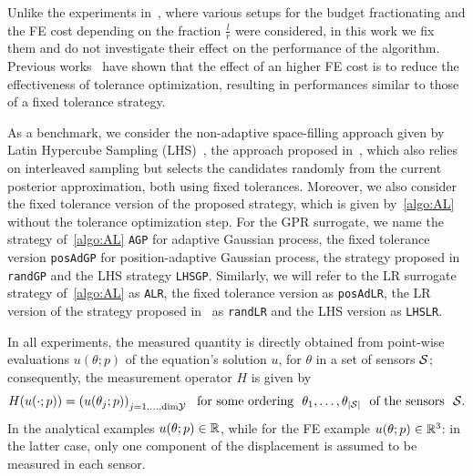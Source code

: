 Unlike the experiments in~\cite{VillaniArconesUngerWeiser2025}, where various setups for the budget fractionating and the FE cost depending on the fraction $\frac{l}{r}$ were considered, in this work we fix them and do not investigate their effect on the performance of the algorithm.
Previous works~\cite{SemlerWeiser2023,VillaniArconesUngerWeiser2025,VillaniUngerWeiser2024} have shown that the effect of an higher FE cost is to reduce the effectiveness of tolerance optimization, resulting in performances similar to those of a fixed tolerance strategy.

As a benchmark, we consider the non-adaptive space-filling approach given by Latin Hypercube Sampling (LHS)~\cite{McKayBeckmanConover1979}, the approach proposed in~\cite{Dinkel2024}, which also relies on interleaved sampling but selects the candidates randomly from the current posterior approximation, both using fixed tolerances.
Moreover, we also consider the fixed tolerance version of the proposed strategy, which is given by~\ref{algo:AL} without the tolerance optimization step. 
For the GPR surrogate, we name the strategy of~\ref{algo:AL} \texttt{AGP} for adaptive Gaussian process, the fixed tolerance version \texttt{posAdGP} for position-adaptive Gaussian process, the strategy proposed in~\cite{Dinkel2024} \texttt{randGP} and the LHS strategy \texttt{LHSGP}.
Similarly, we will refer to the LR surrogate strategy of~\ref{algo:AL} as \texttt{ALR}, the fixed tolerance version as \texttt{posAdLR}, the LR version of the strategy proposed in~\cite{Dinkel2024} as \texttt{randLR} and the LHS version as \texttt{LHSLR}. \medskip

In all experiments, the measured quantity is directly obtained from point-wise evaluations $u(\theta;p)$ of the equation's solution $u$, for $\theta$ in a set of sensors $\mathcal S$; consequently, the measurement operator $H$ is given by
\[
    H(u(\cdot; p)) = \left( u(\theta_j;p)\right)_{j=1,\ldots, \text{dim} \mathcal Y} \ \text{ for some ordering } \ \theta_1, \ldots, \theta_{|\mathcal S|} \ \text{ of the sensors } \ \mathcal S.
\]
In the analytical examples $u(\theta;p) \in \mathbb{R}$, while for the FE example $u(\theta;p)\in \mathbb{R}^3$: in the latter case, only one component of the displacement is assumed to be measured in each sensor. \medskip

